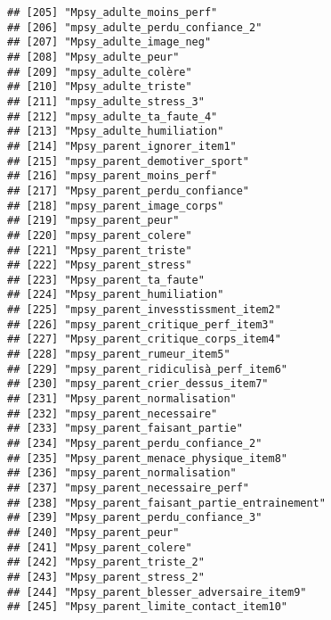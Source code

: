 \documentclass[
]{article}
\begin{document}
\begin{verbatim}
## [205] "Mpsy_adulte_moins_perf"                              
## [206] "mpsy_adulte_perdu_confiance_2"                       
## [207] "Mpsy_adulte_image_neg"                               
## [208] "Mpsy_adulte_peur"                                    
## [209] "mpsy_adulte_colère"                                  
## [210] "Mpsy_adulte_triste"                                  
## [211] "mpsy_adulte_stress_3"                                
## [212] "mpsy_adulte_ta_faute_4"                              
## [213] "Mpsy_adulte_humiliation"                             
## [214] "Mpsy_parent_ignorer_item1"                           
## [215] "mpsy_parent_demotiver_sport"                         
## [216] "mpsy_parent_moins_perf"                              
## [217] "Mpsy_parent_perdu_confiance"                         
## [218] "mpsy_parent_image_corps"                             
## [219] "mpsy_parent_peur"                                    
## [220] "mpsy_parent_colere"                                  
## [221] "Mpsy_parent_triste"                                  
## [222] "Mpsy_parent_stress"                                  
## [223] "Mpsy_parent_ta_faute"                                
## [224] "Mpsy_parent_humiliation"                             
## [225] "mpsy_parent_invesstissment_item2"                    
## [226] "mpsy_parent_critique_perf_item3"                     
## [227] "Mpsy_parent_critique_corps_item4"                    
## [228] "mpsy_parent_rumeur_item5"                            
## [229] "mpsy_parent_ridiculisà_perf_item6"                   
## [230] "mpsy_parent_crier_dessus_item7"                      
## [231] "Mpsy_parent_normalisation"                           
## [232] "mpsy_parent_necessaire"                              
## [233] "mpsy_parent_faisant_partie"                          
## [234] "Mpsy_parent_perdu_confiance_2"                       
## [235] "Mpsy_parent_menace_physique_item8"                   
## [236] "mpsy_parent_normalisation"                           
## [237] "mpsy_parent_necessaire_perf"                         
## [238] "Mpsy_parent_faisant_partie_entrainement"             
## [239] "Mpsy_parent_perdu_confiance_3"                       
## [240] "Mpsy_parent_peur"                                    
## [241] "Mpsy_parent_colere"                                  
## [242] "Mpsy_parent_triste_2"                                
## [243] "Mpsy_parent_stress_2"                                
## [244] "Mpsy_parent_blesser_adversaire_item9"                
## [245] "Mpsy_parent_limite_contact_item10"                   

\end{verbatim}
\end{document}
